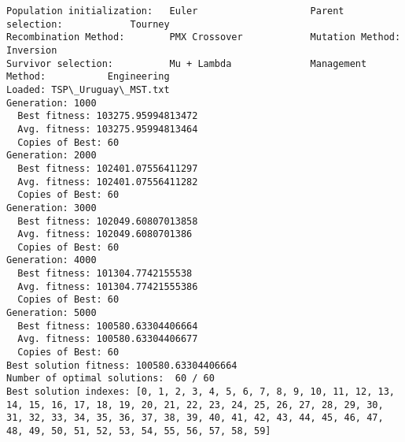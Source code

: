 \documentclass[11pt]{article}
\begin{document}
    \begin{Verbatim}[commandchars=\\\{\}]
Population initialization:   Euler                    Parent selection:            Tourney                  
Recombination Method:        PMX Crossover            Mutation Method:             Inversion                
Survivor selection:          Mu + Lambda              Management Method:           Engineering              
Loaded: TSP\_Uruguay\_MST.txt
Generation: 1000
  Best fitness: 103275.95994813472
  Avg. fitness: 103275.95994813464
  Copies of Best: 60
Generation: 2000
  Best fitness: 102401.07556411297
  Avg. fitness: 102401.07556411282
  Copies of Best: 60
Generation: 3000
  Best fitness: 102049.60807013858
  Avg. fitness: 102049.6080701386
  Copies of Best: 60
Generation: 4000
  Best fitness: 101304.7742155538
  Avg. fitness: 101304.77421555386
  Copies of Best: 60
Generation: 5000
  Best fitness: 100580.63304406664
  Avg. fitness: 100580.63304406677
  Copies of Best: 60
Best solution fitness: 100580.63304406664
Number of optimal solutions:  60 / 60
Best solution indexes: [0, 1, 2, 3, 4, 5, 6, 7, 8, 9, 10, 11, 12, 13, 14, 15, 16, 17, 18, 19, 20, 21, 22, 23, 24, 25, 26, 27, 28, 29, 30, 31, 32, 33, 34, 35, 36, 37, 38, 39, 40, 41, 42, 43, 44, 45, 46, 47, 48, 49, 50, 51, 52, 53, 54, 55, 56, 57, 58, 59]

\end{Verbatim}
\end{document}
